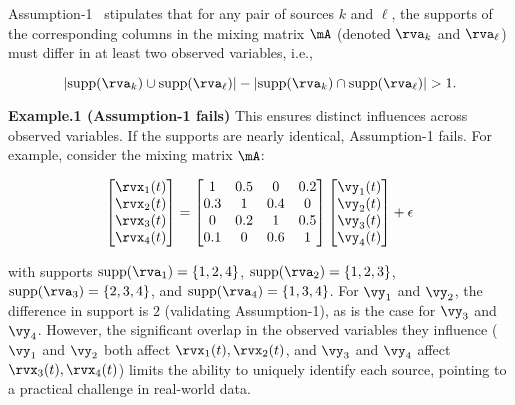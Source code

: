 \documentclass{article} %
\theoremstyle{plain}
\theoremstyle{definition}
\theoremstyle{remark}
\numberwithin{equation}{section}
\begin{document}
Assumption-1~\citep{ng2023identifiability} stipulates that for any pair of sources \(k\) and \(\ell\), the supports of the corresponding columns in the mixing matrix \( \mA \) (denoted \( \rva_k \) and \( \rva_\ell \)) must differ in at least two observed variables, i.e.,

\[
| \text{supp}(\rva_k) \cup \text{supp}(\rva_\ell) | - | \text{supp}(\rva_k) \cap \text{supp}(\rva_\ell) | > 1.
\]

\textbf{Example.1 (Assumption-1 fails)} This ensures distinct influences across observed variables. If the supports are nearly identical, Assumption-1 fails. For example, consider the mixing matrix \( \mA \):

\[
\begin{bmatrix}
\rvx_1(t) \\
\rvx_2(t) \\
\rvx_3(t) \\
\rvx_4(t)
\end{bmatrix}
=
\begin{bmatrix}
1 & 0.5 & 0 & 0.2 \\
0.3 & 1 & 0.4 & 0 \\
0 & 0.2 & 1 & 0.5 \\
0.1 & 0 & 0.6 & 1
\end{bmatrix}
\begin{bmatrix}
\vy_1(t) \\
\vy_2(t) \\
\vy_3(t) \\
\vy_4(t)
\end{bmatrix}
+ \epsilon
\]

with supports \( \text{supp}(\rva_1) = \{1, 2, 4\} \), \( \text{supp}(\rva_2) = \{1, 2, 3\} \), \( \text{supp}(\rva_3) = \{2, 3, 4\} \), and \( \text{supp}(\rva_4) = \{1, 3, 4\} \). For \( \vy_1 \) and \( \vy_2 \), the difference in support is \(2\) (validating Assumption-1), as is the case for \( \vy_3 \) and \( \vy_4 \). However, the significant overlap in the observed variables they influence (\( \vy_1 \) and \( \vy_2 \) both affect \( \rvx_1(t), \rvx_2(t) \), and \( \vy_3 \) and \( \vy_4 \) affect \( \rvx_3(t), \rvx_4(t) \)) limits the ability to uniquely identify each source, pointing to a practical challenge in real-world data.

\end{document}
